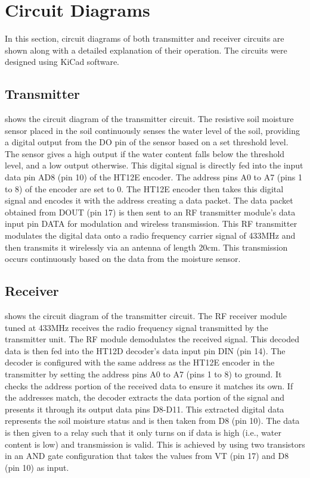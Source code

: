\section{Circuit Diagrams}
In this section, circuit diagrams of both transmitter and receiver circuits are shown along with a detailed explanation of their operation. The circuits were designed using KiCad software.
\subsection{Transmitter}


 shows the circuit diagram of the transmitter circuit. The resistive soil moisture sensor placed in the soil continuously senses the water level of the soil, providing a digital output from the DO pin of the sensor based on a set threshold level. The sensor gives a high output if the water content falls below the threshold level, and a low output otherwise. This digital signal is directly fed into the input data pin AD8 (pin 10) of the HT12E encoder. The address pins A0 to A7 (pins 1 to 8) of the encoder are set to 0. The HT12E encoder then takes this digital signal and encodes it with the address creating a data packet. The data packet obtained from DOUT (pin 17) is then sent to an RF transmitter module's data input pin DATA for modulation and wireless transmission. This RF transmitter modulates the digital data onto a radio frequency carrier signal of 433MHz and then transmits it wirelessly via an antenna of length 20cm. This transmission occurs continuously based on the data from the moisture sensor.

\subsection{Receiver}

 shows the circuit diagram of the transmitter circuit. The RF receiver module tuned at 433MHz receives the radio frequency signal transmitted by the transmitter unit. The RF module demodulates the received signal. This decoded data is then fed into the HT12D decoder's data input pin DIN (pin 14). The decoder is configured with the same address as the HT12E encoder in the transmitter by setting the address pins A0 to A7 (pins 1 to 8) to ground. It checks the address portion of the received data to ensure it matches its own. If the addresses match, the decoder extracts the data portion of the signal and presents it through its output data pins D8-D11. This extracted digital data represents the soil moisture status and is then taken from D8 (pin 10). The data is then given to a relay such that it only turns on if data is high (i.e., water content is low) and transmission is valid. This is achieved by using two transistors in an AND gate configuration that takes the values from VT (pin 17) and D8 (pin 10) as input.

